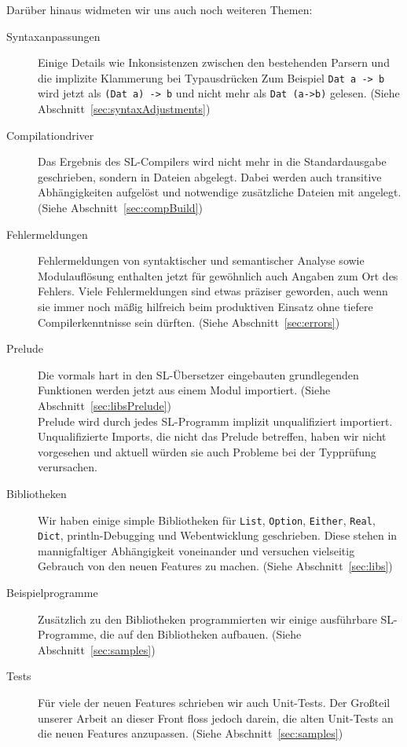 \documentclass[runningheads]{llncs}
\begin{document}
Darüber hinaus widmeten wir uns auch noch weiteren Themen:

\begin{description}
 \item[Syntaxanpassungen] Einige Details wie Inkonsistenzen zwischen den
   bestehenden Parsern und die implizite Klammerung bei Typausdrücken
   Zum Beispiel \verb|Dat a -> b| wird jetzt als \verb|(Dat a) -> b| und
   nicht mehr als \verb|Dat (a->b)| gelesen.
   (Siehe Abschnitt~\ref{sec:syntaxAdjustments})
 \item[Compilationdriver] Das Ergebnis des SL-Compilers wird nicht mehr
   in die Standardausgabe geschrieben, sondern in Dateien abgelegt. Dabei werden auch
   transitive Abhängigkeiten aufgelöst und notwendige zusätzliche Dateien
   mit angelegt. (Siehe Abschnitt~\ref{sec:compBuild})
 \item[Fehlermeldungen] Fehlermeldungen von syntaktischer und semantischer
   Analyse sowie Modulauflösung enthalten jetzt für gewöhnlich auch Angaben
   zum Ort des Fehlers. Viele Fehlermeldungen sind etwas präziser geworden,
   auch wenn sie immer noch mäßig hilfreich beim produktiven Einsatz ohne
   tiefere Compilerkenntnisse sein dürften.
   (Siehe Abschnitt~\ref{sec:errors})
 \item[Prelude] Die vormals hart in den SL-Übersetzer eingebauten grundlegenden
   Funktionen werden jetzt aus einem Modul importiert.
   (Siehe Abschnitt~\ref{sec:libsPrelude})\\
   Prelude wird durch jedes SL-Programm implizit unqualifiziert importiert.
   Unqualifizierte Imports, die nicht das Prelude betreffen, haben wir nicht
   vorgesehen und aktuell würden sie auch Probleme bei der Typprüfung
   verursachen.
 \item[Bibliotheken] Wir haben einige simple Bibliotheken für \verb|List|,
   \verb|Option|, \verb|Either|, \verb|Real|, \verb|Dict|, println-Debugging
   und Webentwicklung geschrieben. Diese stehen in mannigfaltiger Abhängigkeit
   voneinander und versuchen vielseitig Gebrauch von den neuen Features zu
   machen.
   (Siehe Abschnitt~\ref{sec:libs})
 \item[Beispielprogramme] Zusätzlich zu den Bibliotheken programmierten wir
   einige ausführbare SL-Programme, die auf den Bibliotheken aufbauen.
   (Siehe Abschnitt~\ref{sec:samples})
 \item[Tests] Für viele der neuen Features schrieben wir auch Unit-Tests.
   Der Großteil unserer Arbeit an dieser Front floss jedoch darein, die alten
   Unit-Tests an die neuen Features anzupassen.
   (Siehe Abschnitt~\ref{sec:samples})
\end{description}
\end{document}
